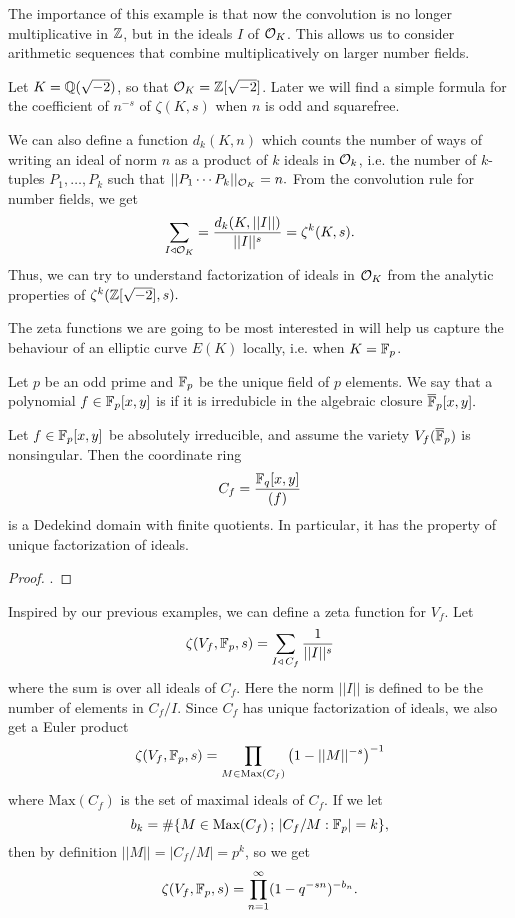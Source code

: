 \documentclass[12pt, a4paper]{report}
\begin{document}
The importance of this example is that now the convolution is no longer
multiplicative in ${\mathbb Z}$, but in the ideals $I$ of ${\mathcal O}_K$. This allows us to
consider arithmetic sequences that combine multiplicatively on larger
number fields.

\begin{example} \label{dedekind_example}
  Let $K = {\mathbb Q}(\sqrt{-2})$, so that ${\mathcal O}_K = {\mathbb Z}[\sqrt{-2}]$. 
  Later we will find a simple formula for the coefficient of $n^{-s}$ of
  $\zeta(K,s)$ when $n$ is odd and squarefree.

  We can also
  define a function $d_k(K,n)$ which counts the number of ways of writing an
  ideal of norm $n$ as a product of $k$ ideals in ${\mathcal O}_k$, i.e. the number of
  $k$-tuples $P_1, \dots, P_k$ such that $||P_1 \cdots P_k||_{{\mathcal O}_K} = n.$
  From the convolution rule for number fields, we get
  \[\sum\limits_{I \triangleleft {\mathcal O}_K} = \frac{d_k(K,||I||)}{||I||^s} =
  \zeta^k(K,s).\]
Thus, we can try to understand factorization of ideals in ${\mathcal O}_K$ from
the analytic properties of $\zeta^k({\mathbb Z}[\sqrt{-2}], s).$
\end{example}

The zeta functions we are going to be most interested in will help us capture
the behaviour of an elliptic curve $E(K)$ locally, i.e. when $K = \mathbb{F}_p$.

Let $p$ be an odd prime and $\mathbb{F}_p$ be the unique field of $p$ elements. We say
that a polynomial $f \in \mathbb{F}_p[x,y]$ is  if it is
irredubicle in the algebraic closure $\overline{\mathbb{F}}_p[x,y].$

\begin{prop}
  Let $f \in \mathbb{F}_p[x,y]$ be absolutely irreducible, and assume the variety
  $V_f(\overline{\mathbb{F}}_p)$ is nonsingular. Then the coordinate ring
  \[C_f = \frac{\mathbb{F}_q[x,y]}{(f)}\]
  is a Dedekind domain with finite quotients. In particular, it has the property
  of unique factorization of ideals.
\end{prop}
\begin{proof}
  \cite[See][Corollary 2.7, page 229]{lorenzini}.
\end{proof}

Inspired by our previous examples, we can define a zeta function for $V_f$. Let
\[\zeta(V_f, \mathbb{F}_p, s) = \sum\limits_{I \triangleleft \, C_f} \frac{1}{||I||^s}
\]
where the sum is over all ideals of $C_f$. Here the norm $||I||$ is defined to
be the number of elements in $C_f / I$. Since $C_f$ has unique factorization
of ideals, we also get a Euler product 
\[\zeta(V_f, \mathbb{F}_p, s) = \prod\limits_{M \in \text{Max}(C_f)} \left( 1 - ||M||^{-s} \right)^{-1}\]
where $\text{Max}(C_f)$ is the set of maximal ideals of $C_f$.
If we let
\[b_k = \# \{M \in \text{Max}(C_f) \, ; \, |C_f/M : \mathbb{F}_p| = k\},\]
then by definition $||M|| = |C_f/M| = p^k$, so we get
\[\zeta(V_f, \mathbb{F}_p, s) = \prod\limits_{n=1}^\infty (1 - q^{-sn})^{-b_n}.\]
\end{document}

